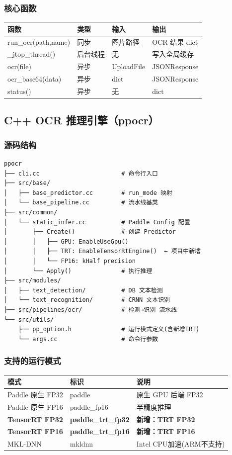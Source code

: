 \documentclass[12pt,a4paper]{ctexart}
\begin{document}
\subsubsection{核心函数}
\begin{longtable}{|p{3cm}|p{3cm}|p{3.5cm}|p{3.5cm}|}\hline
\textbf{函数} & \textbf{类型} & \textbf{输入} & \textbf{输出} \\\hline
run\_ocr(path,name) & 同步 & 图片路径 & OCR 结果 dict \\\hline
\_jtop\_thread() & 后台线程 & 无 & 写入全局缓存 \\\hline
ocr(file) & 异步 & UploadFile & JSONResponse \\\hline
ocr\_base64(data) & 异步 & dict & JSONResponse \\\hline
status() & 异步 & 无 & dict \\\hline
\end{longtable}

\subsection{C++ OCR 推理引擎（ppocr）}

\subsubsection{源码结构}
\begin{lstlisting}[caption={ppocr 源码结构}]
ppocr
├── cli.cc                       # 命令行入口
├── src/base/
│   ├── base_predictor.cc        # run_mode 映射
│   └── base_pipeline.cc         # 流水线基类
├── src/common/
│   └── static_infer.cc          # Paddle Config 配置
│       ├── Create()             # 创建 Predictor
│       │   ├── GPU: EnableUseGpu()
│       │   ├── TRT: EnableTensorRtEngine()  ← 项目中新增
│       │   └── FP16: kHalf precision
│       └── Apply()              # 执行推理
├── src/modules/
│   ├── text_detection/          # DB 文本检测
│   └── text_recognition/        # CRNN 文本识别
├── src/pipelines/ocr/           # 检测→识别 流水线
└── src/utils/
    ├── pp_option.h              # 运行模式定义(含新增TRT)
    └── args.cc                  # 命令行参数
\end{lstlisting}

\subsubsection{支持的运行模式}
\begin{longtable}{|p{4cm}|p{3cm}|p{6cm}|}\hline
\textbf{模式} & \textbf{标识} & \textbf{说明} \\\hline
Paddle 原生 FP32 & paddle & 原生 GPU 后端 FP32 \\\hline
Paddle 原生 FP16 & paddle\_fp16 & 半精度推理 \\\hline
\textbf{TensorRT FP32} & \textbf{paddle\_trt\_fp32} & \textbf{新增：TRT FP32} \\\hline
\textbf{TensorRT FP16} & \textbf{paddle\_trt\_fp16} & \textbf{新增：TRT FP16} \\\hline
MKL-DNN & mkldnn & Intel CPU加速(ARM不支持) \\\hline
\end{longtable}
\end{document}
